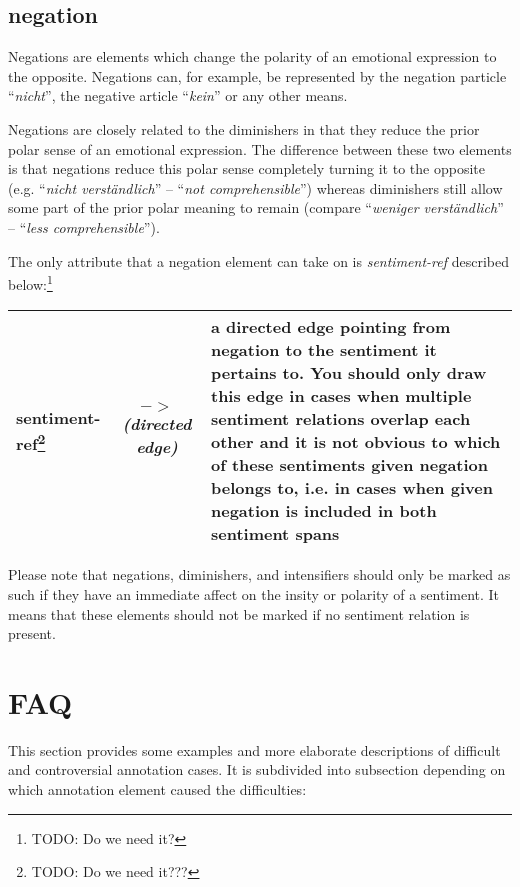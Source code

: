 \documentclass[11pt,a4paper]{article}
\newlength\clmnwidth
\begin{document}
\subsection{negation}
Negations are elements which change the polarity of an emotional
expression to the opposite.  Negations can, for example, be
represented by the negation particle ``\textit{nicht}'', the negative
article ``\textit{kein}'' or any other means.

Negations are closely related to the diminishers in that they reduce
the prior polar sense of an emotional expression.  The difference
between these two elements is that negations reduce this polar sense
completely turning it to the opposite (e.g. ``\textit{nicht
  verst\"andlich}'' -- ``\textit{not comprehensible}'') whereas
diminishers still allow some part of the prior polar meaning to remain
(compare ``\textit{weniger verst\"andlich}'' -- ``\textit{less
  comprehensible}'').

The only attribute that a negation element can take on is
\textit{sentiment-ref} described below:\footnote{TODO: Do we need it?}

\begin{tabular}{|l|c|p{\clmnwidth}|}\hline
  sentiment-ref\footnote{TODO: Do we need it???} &
  \textit{$->$\newline(directed edge)} & a directed edge pointing from
  negation to the sentiment it pertains to. You should only draw this
  edge in cases when multiple sentiment relations overlap each other
  and it is not obvious to which of these sentiments given negation
  belongs to, i.e. in cases when given negation is included in both
  sentiment spans\\\hline
\end{tabular}

Please note that negations, diminishers, and intensifiers should only
be marked as such if they have an immediate affect on the insity or
polarity of a sentiment.  It means that these elements should not be
marked if no sentiment relation is present.

\section{FAQ}
This section provides some examples and more elaborate descriptions of
difficult and controversial annotation cases.  It is subdivided into
subsection depending on which annotation element caused the
difficulties:
\end{document}
